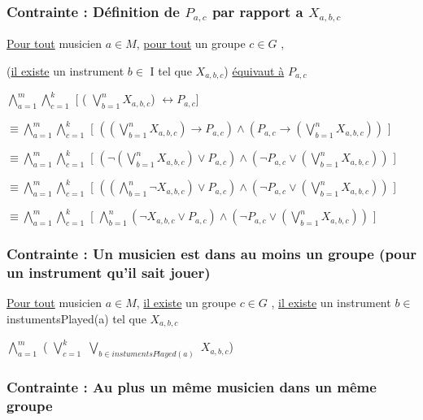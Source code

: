 \documentclass[a4paper,10pt]{article}
\begin{document}
\subsubsection{Contrainte : Définition de $P_{a,c}$ par rapport a $X_{a,b,c}$}

\underline{Pour tout} musicien $a \in M $, \underline{pour tout} un groupe $c \in G$ , 

(\underline{il existe} un instrument $b \in$ I  tel que $X_{a,b,c}$)
\underline{équivaut à} $P_{a,c}$

$\bigwedge \limits_{a=1}^{m}  \bigwedge \limits_{c=1}^{k}$ [ ( $\bigvee \limits_{b=1}^{n}  X_{a,b,c}$) $\leftrightarrow P_{a,c}$]

$\equiv  \bigwedge \limits_{a=1}^{m}  \bigwedge \limits_{c=1}^{k}$ [ $ ( (\bigvee \limits_{b=1}^{n}  X_{a,b,c}) \rightarrow P_{a,c} ) \wedge
(P_{a,c} \rightarrow  (\bigvee \limits_{b=1}^{n}  X_{a,b,c}) )$ ]

$\equiv  \bigwedge \limits_{a=1}^{m}  \bigwedge \limits_{c=1}^{k}$ [ $ ( \neg (\bigvee \limits_{b=1}^{n}  X_{a,b,c}) \vee P_{a,c} ) \wedge
 (\neg P_{a,c} \vee  (\bigvee \limits_{b=1}^{n}  X_{a,b,c}) )$ ]
 
$\equiv  \bigwedge \limits_{a=1}^{m}  \bigwedge \limits_{c=1}^{k}$ [ $ ( ( \bigwedge \limits_{b=1}^{n}  \neg X_{a,b,c}) \vee P_{a,c} ) \wedge
 (\neg P_{a,c} \vee  (\bigvee \limits_{b=1}^{n}  X_{a,b,c}) )$ ]
 
$\equiv  \bigwedge \limits_{a=1}^{m}  \bigwedge \limits_{c=1}^{k}$ [ $ \bigwedge \limits_{b=1}^{n}  ( \neg X_{a,b,c} \vee P_{a,c} ) \wedge
 (\neg P_{a,c} \vee  (\bigvee \limits_{b=1}^{n}  X_{a,b,c}) )$ ] 

 
\subsubsection{Contrainte : Un musicien est dans au moins un groupe (pour un instrument qu'il sait jouer)}

\underline{Pour tout} musicien $a \in M $, \underline{il existe} un groupe $c \in G$ , \underline{il existe} un instrument $b \in$ instumentsPlayed(a)  tel que $X_{a,b,c}$


$\bigwedge \limits_{a=1}^{m}$ ( $\bigvee \limits_{c=1}^{k}$ $\bigvee \limits_{b \in instumentsPlayed(a) }$  $X_{a,b,c}$)



\subsubsection{Contrainte : Au plus un même musicien dans un même groupe}
\end{document}
